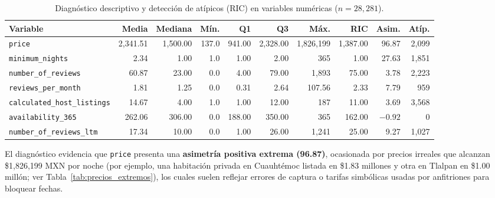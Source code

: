 \documentclass[12pt,letterpaper,oneside]{report}
\begin{document}
\begin{table}[htbp]
\centering
\caption{Diagnóstico descriptivo y detección de atípicos (RIC) en variables numéricas ($n = 28{,}281$).}
\label{tab:perfil_numericas}
\scriptsize
\setlength{\tabcolsep}{4pt}
\renewcommand{\arraystretch}{1.15}
\begin{tabular}{l r r r r r r r r r}
\toprule
\rowcolor{TableHeader}
\textbf{Variable} & \textbf{Media} & \textbf{Mediana} & \textbf{Mín.} & \textbf{Q1} & \textbf{Q3} & \textbf{Máx.} & \textbf{RIC} & \textbf{Asim.} & \textbf{Atíp.} \\
\midrule
\texttt{price}                         & 2,341.51 & 1,500.00 & 137.0 & 941.00 & 2,328.00 & 1,826,199 & 1,387.00 &  96.87 & 2,099 \\
\rowcolor{RowStripe}
\texttt{minimum\_nights}               &     2.34 &     1.00 &   1.0 &   1.00 &     2.00 &       365 &     1.00 &  27.63 & 1,851 \\
\texttt{number\_of\_reviews}           &    60.87 &    23.00 &   0.0 &   4.00 &    79.00 &     1,893 &    75.00 &   3.78 & 2,223 \\
\rowcolor{RowStripe}
\texttt{reviews\_per\_month}           &     1.81 &     1.25 &   0.0 &   0.31 &     2.64 &    107.56 &     2.33 &   7.79 &   959 \\
\texttt{calculated\_host\_listings}    &    14.67 &     4.00 &   1.0 &   1.00 &    12.00 &       187 &    11.00 &   3.69 & 3,568 \\
\rowcolor{RowStripe}
\texttt{availability\_365}             &   262.06 &   306.00 &   0.0 & 188.00 &   350.00 &       365 &   162.00 & $-0.92$ &    0 \\
\texttt{number\_of\_reviews\_ltm}      &    17.34 &    10.00 &   0.0 &   1.00 &    26.00 &     1,241 &    25.00 &   9.27 & 1,027 \\
\bottomrule
\end{tabular}
\end{table}

El diagnóstico evidencia que \texttt{price} presenta una \textbf{asimetría positiva extrema (96.87)}, ocasionada por precios irreales que alcanzan \$1,826,199 MXN por noche (por ejemplo, una habitación privada en Cuauhtémoc listada en \$1.83 millones y otra en Tlalpan en \$1.00 millón; ver Tabla~\ref{tab:precios_extremos}), los cuales suelen reflejar errores de captura o tarifas simbólicas usadas por anfitriones para bloquear fechas.
\end{document}
